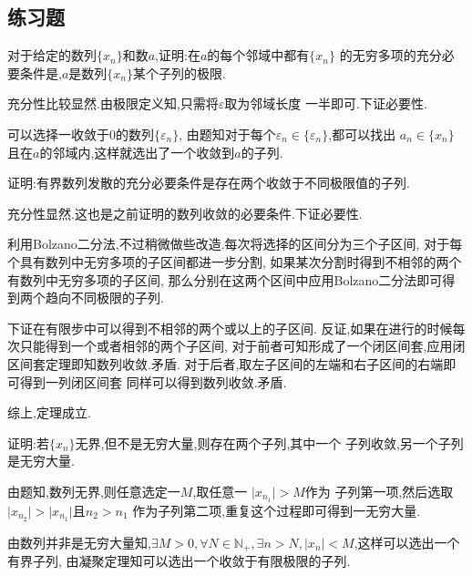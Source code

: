 \documentclass[cn]{elegantbook}
\begin{document}
        \subsection{练习题}
            \begin{exercise}
                对于给定的数列$\{x_n\}$和数$a$,证明:在$a$的每个邻域中都有$\{x_n\}$
            的无穷多项的充分必要条件是,$a$是数列$\{x_n\}$某个子列的极限.
            \end{exercise}
            \begin{solution}
                充分性比较显然.由极限定义知,只需将$\varepsilon$取为邻域长度
                一半即可.下证必要性.
                
                可以选择一收敛于0的数列$\{\varepsilon_n\}$,
                由题知对于每个$\varepsilon_n\in\{\varepsilon_n\}$,都可以找出
                $a_n\in\{x_n\}$且在$a$的邻域内,这样就选出了一个收敛到$a$的子列.
            \end{solution}

            \begin{exercise}
                证明:有界数列发散的充分必要条件是存在两个收敛于不同极限值的子列.
            \end{exercise}
            \begin{solution}
                充分性显然.这也是之前证明的数列收敛的必要条件.下证必要性.

                利用Bolzano二分法,不过稍微做些改造.每次将选择的区间分为三个子区间,
                对于每个具有数列中无穷多项的子区间都进一步分割,
                如果某次分割时得到不相邻的两个有数列中无穷多项的子区间,
                那么分别在这两个区间中应用Bolzano二分法即可得到两个趋向不同极限的子列.

                下证在有限步中可以得到不相邻的两个或以上的子区间.
                反证,如果在进行的时候每次只能得到一个或者相邻的两个子区间,
                对于前者可知形成了一个闭区间套,应用闭区间套定理即知数列收敛.矛盾.
                对于后者,取左子区间的左端和右子区间的右端即可得到一列闭区间套
                同样可以得到数列收敛.矛盾.

                综上,定理成立.
            \end{solution}

            \begin{exercise}
                证明:若$\{x_n\}$无界,但不是无穷大量,则存在两个子列,其中一个
                子列收敛,另一个子列是无穷大量.
            \end{exercise}
            \begin{solution}
                由题知,数列无界,则任意选定一$M$,取任意一
                $\lvert x_{n_1}\rvert>M$作为
                子列第一项,然后选取
                $\lvert x_{n_2}\rvert>\lvert x_{n_1}\rvert$且$n_2>n_1$
                作为子列第二项,重复这个过程即可得到一无穷大量.

                由数列并非是无穷大量知,$\exists M>0,\forall N\in \mathbb{N}_+,
                \exists n>N,\lvert x_n\rvert<M$,这样可以选出一个有界子列,
                由凝聚定理知可以选出一个收敛于有限极限的子列.
            \end{solution}
\end{document}
